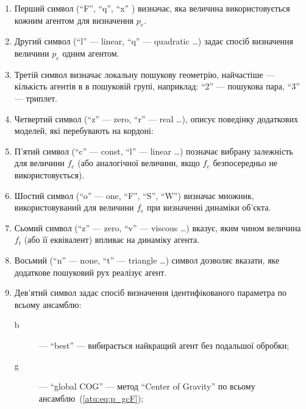 \documentclass[a4paper,13pt]{atuaref}
\begin{document}
\begin{enumerate}

  \item
  Перший символ (``F'', ``q'', ``x'' ) визначає,
  яка величина використовується кожним агентом для визначення $ p_e $.

  \item

    Другий символ (``l'' --- linear, ``q'' --- quadratic \ldots ) задає спосіб визначення величини $ p_e $ одним агентом.

  \item
  Третій символ визначає локальну пошукову геометрію, найчастіше --- кількість
    агентів в в пошуковій групі, наприклад: ``2'' --- пошукова пара, ``3'' --- триплет.

  \item
    Четвертий символ (``z'' --- zero, ``r'' --- real \ldots),
    описує поведінку додаткових моделей, які перебувають на кордоні:

  \item
    П'ятий символ (``c'' --- const, ``l'' --- linear \ldots )
    позначає вибрану залежність для величини $ f_e $ (або
    аналогічної величини, якщо $ f_e $ безпосередньо не використовується).

  \item
    Шостий символ (``o'' --- one, ``F'', ``S'', ``W'') визначає множник,
    використовуваний для величини $ f_e $ при визначенні динаміки об'єкта.

  \item
   Сьомий символ (``z'' --- zero, ``v'' --- viscous \ldots)
    вказує, яким чином величина $ f_t $ (або її еквівалент) впливає на динаміку агента.

  \item
   Восьмий (``n'' --- none, ``t'' --- triangle \ldots ) символ дозволяє вказати, яке додаткове пошуковий рух реалізує агент.

  \item
    Дев'ятий символ задає спосіб визначення ідентифікованого параметра по всьому ансамблю:
    \begin{description}

      \item[b]  --- ``best''
        --- вибирається найкращий агент без подальшої обробки;

      \item[g]  --- ``global COG'' ---
        метод ``Center of Gravity'' по всьому ансамблю~(\ref{atu:eq:p_gcF});


\end{description}
\end{enumerate}
\end{document}
